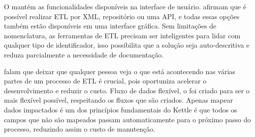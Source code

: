 O \pdi mantém as funcionalidades disponíveis na interface de usuário.  afirmam que é possível realizar ETL por XML, repositório ou uma API, e todas essas opções também estão disponíveis em uma interface gráfica. Sem limitações de nomenclatura, as ferramentas de ETL precisam ser inteligentes para lidar com qualquer tipo de identificador, isso possibilita que a solução seja auto-descritiva e reduza parcialmente a necessidade de documentação.

 falam que deixar que qualquer pessoa veja o que está acontecendo nas várias partes de um processo de ETL é crucial, pois oportuniza acelerar o desenvolvimento e reduzir o custo. Fluxo de dados flexível, o \pdi foi criado para ser o mais flexível possível, respeitando os fluxos que são criados. Apenas mapear dados impactados é um dos princípios fundamentais do Kettle é que todos os campos que não são mapeados passam automaticamente para o próximo passo do processo, reduzindo assim o custo de manutenção.

